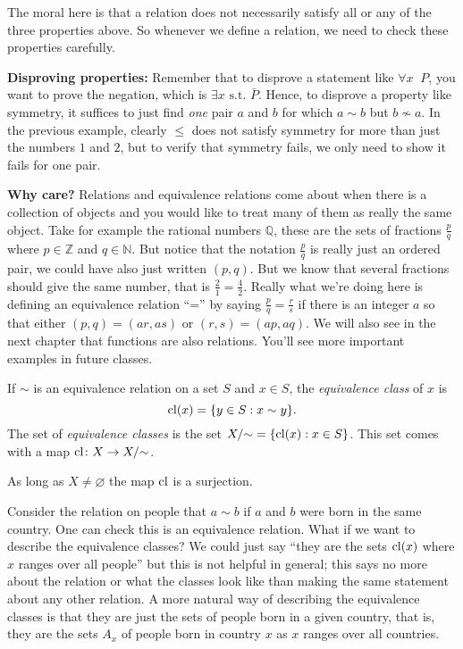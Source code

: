 \documentclass[11pt,dvipsnames]{book}
\numberwithin{figure}{section} %
\numberwithin{table}{section} %
\begin{document}
The moral here is that a relation does not necessarily satisfy all or any of the three properties above. So whenever we define a relation, we need to check these properties carefully.

\begin{protip}
{\bf Disproving properties:} Remember that to disprove a statement like $\forall x\;\; P$, you want to prove the negation, which is $\exists x\mbox{ s.t. } \bar{P}$. Hence, to disprove a property like symmetry, it suffices to just find {\it one} pair $a$ and $b$ for which $a\sim b$ but $b\not\sim a$. In the previous example, clearly $\leq  $ does not satisfy symmetry for more than just the numbers $1$ and $2$, but to verify that symmetry fails, we only need to show it fails for one pair.
\end{protip}

{\bf Why care?} Relations and equivalence relations come about when there is a collection of objects and you would like to treat many of them as really the same object. Take for example the rational numbers $\mathbb{Q}$, these are the sets of fractions $\frac{p}{q}$ where $p\in\mathbb{Z}$ and $q\in \mathbb{N}$. But notice that the notation $\frac{p}{q}$ is really just an ordered pair, we could have also just written $(p,q)$. But we know that several fractions should give the same number, that is $\frac{2}{1}=\frac{4}{2}$. Really what we're doing here is defining an equivalence relation ``='' by saying $\frac{p}{q}=\frac{r}{s}$ if there is an integer $a$ so that either $(p,q)=(ar,as)$ or $(r,s)=(ap,aq)$. We will also see in the next chapter that functions are also relations. You'll see more important examples in future classes.

\def\cl{{\rm cl}}

\begin{definition}
If $\sim$ is an equivalence relation on a set $S$ and $x\in S$, the {\it equivalence class} of $x$ is
\[
\cl(x) = \{y\in S : x\sim y\}.
\]
The set of {\it equivalence classes} is the set $X/{\sim} = \{\cl(x) : x\in S\}$.
This set comes with a map $\cl \colon X \to X/{\sim}$.
\end{definition}

As long as $X \neq \varnothing$ the map $\cl$ is a surjection.

\begin{example}
Consider the relation on people that $a\sim b$ if $a$ and $b$ were born in the same country. One can check this is an equivalence relation. What if we want to describe the equivalence classes? We could just say ``they are the sets $\cl(x)$ where $x$ ranges over all people'' but this is not helpful in general; this says no more about the relation or what the classes look like than making the same statement about any other relation. A more natural way of describing the equivalence classes is that they are just the sets of people born in a given country, that is, they are the sets $A_x$ of people born in country $x$ as $x$ ranges over all countries.
\end{example}
\end{document}
